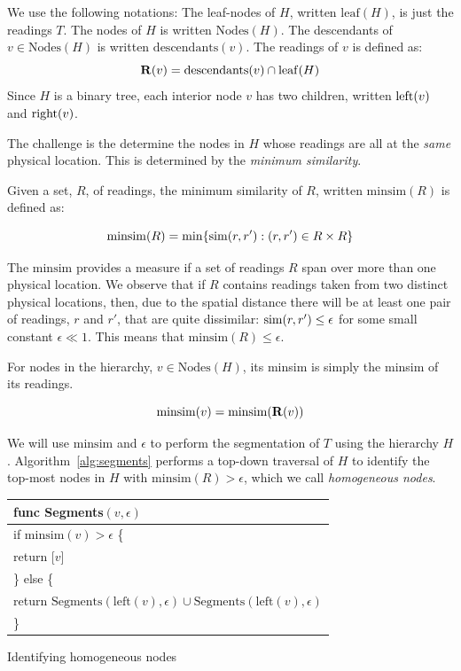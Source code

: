 We use the following notations:
The leaf-nodes of $H$, written $\mathrm{leaf}(H)$, is just the readings $T$.
The nodes of $H$ is written $\mathrm{Nodes}(H)$.  The descendants of $v\in
\mathrm{Nodes}(H)$ is written $\mathrm{descendants}(v)$.  The readings of $v$ is
defined as: $$\mathbf{R}(v) = \mathrm{descendants}(v)\cap\mathrm{leaf}(H)$$
Since $H$ is a binary tree, each interior node $v$ has two children, written $\mathrm{left}(v)$ and $\mathrm{right}(v)$.

The challenge is the determine the nodes in $H$ whose readings are all at the
{\em same} physical location.  This is determined by the {\em minimum
similarity}.

\begin{definition}
    Given a set, $R$, of readings, the minimum similarity of $R$, written
    $\mathrm{minsim}(R)$ is defined as:

    $$\mathrm{minsim}(R) = \min\{\mathrm{sim}(r,r'): (r,r')\in R\times R\}$$
    \label{def:minsim}
\end{definition}

The $\mathrm{minsim}$ provides a measure if a set of readings $R$ span over more
than one physical location.
We observe that if $R$ contains readings taken from two distinct physical
locations, then, due to the spatial distance there will be at least one pair of
readings, $r$ and $r'$, that are quite dissimilar: $\mathrm{sim}(r, r') \leq \epsilon$ for some
small constant $\epsilon\ll 1$.  This means that $\mathrm{minsim}(R)\leq \epsilon$.

For nodes in the hierarchy, $v\in\mathrm{Nodes}(H)$, its minsim is simply the
minsim of its readings.

\begin{definition}
    $$\mathrm{minsim}(v) = \mathrm{minsim}(\mathbf{R}(v))$$
\end{definition}

We will use $\mathrm{minsim}$ and $\epsilon$ to perform the segmentation of $T$
using the hierarchy $H$.  Algorithm~\ref{alg:segments} performs a top-down
traversal of $H$ to identify the top-most nodes in $H$ with 
$\mathrm{minsim}(R) > \epsilon$, which we call {\em homogeneous nodes}.

\begin{algorithm}[t]
    \centering
    \begin{tabular}{|l|}\hline
        func Segments$(v, \epsilon)$ \\ \hline
        if $\mathrm{minsim}(v) > \epsilon$ \{ \\
        \RRR return [$v$] \\
        \} else \{ \\
        \RRR return $\mathrm{Segments}(\mathrm{left}(v), \epsilon) \cup
                      \mathrm{Segments}(\mathrm{left}(v), \epsilon)$ \\
        \} \\ \hline
    \end{tabular}
    \vspace{0.4cm}
    \caption{Identifying homogeneous nodes}
    \label{alg:segments}
\end{algorithm}

